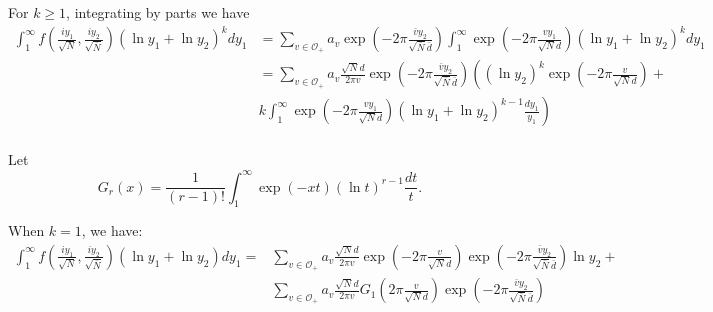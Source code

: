 \documentclass{article}
\theoremstyle{plain}
\begin{document}
For $k \geq 1$, integrating by parts we have
\begin{align*}
 \int_{1}^{\infty} f\left(\frac{iy_1}{\sqrt{N}},\frac{iy_2}{\sqrt{\bar{N}}}\right) (\ln y_1+\ln y_2)^k dy_1
 &= \sum_{v \in \mathcal{O}_+} a_v  \exp \left( -2\pi \frac{\bar{v} y_2}{\sqrt{\bar{N}}\bar{d}}\right)\int_{1}^{\infty} \exp\left( -2\pi \frac{vy_1}{\sqrt{N} d}\right) (\ln y_1+\ln y_2)^k dy_1\\
 &= \sum_{v \in \mathcal{O}_+} a_v \frac{\sqrt{N}d}{2 \pi v} \exp \left( -2\pi \frac{\bar{v} y_2}{\sqrt{\bar{N}}\bar{d}}\right) \left((\ln y_2)^k \exp\left( -2\pi \frac{v}{\sqrt{N} d}\right) \right. + \\
 & \left. k \int_1^{\infty} \exp\left( -2\pi \frac{vy_1}{\sqrt{N} d}\right) (\ln y_1+\ln y_2)^{k-1} \frac{dy_1}{y_1}\right)\\
\end{align*}


Let
\begin{equation*}
G_r(x)=\frac{1}{(r-1)!}\int_1^{\infty} \exp(-xt) (\ln t)^{r-1}\frac{dt}{t}.
\end{equation*}

When $k=1$, we have:
\begin{align*}
\int_{1}^{\infty} f\left(\frac{iy_1}{\sqrt{N}},\frac{iy_2}{\sqrt{\bar{N}}}\right) (\ln y_1+\ln y_2) dy_1
= & \sum_{v \in \mathcal{O}_+} a_v \frac{\sqrt{N}d}{2 \pi v} \exp\left( -2\pi \frac{v}{\sqrt{N} d}\right)  \exp \left( -2\pi \frac{\bar{v} y_2}{\sqrt{\bar{N}}\bar{d}}\right) \ln y_2 + \\
& \sum_{v \in \mathcal{O}_+} a_v \frac{\sqrt{N}d}{2 \pi v} G_1\left( 2\pi \frac{v}{\sqrt{N} d}\right) \exp \left( -2\pi \frac{\bar{v} y_2}{\sqrt{\bar{N}}\bar{d}}\right)
\end{align*}
\end{document}
